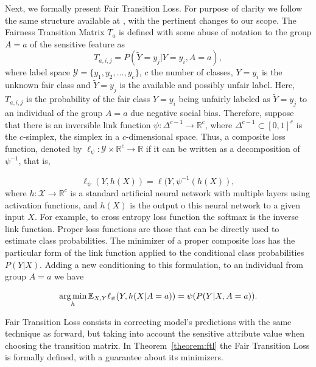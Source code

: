Next, we formally present Fair Transition Loss. For purpose of clarity we follow the same structure available at \citep{Patrini2017}, with the pertinent changes to our scope. The Fairness Transition Matrix $T_a$ is defined with some abuse of notation to the group $A=a$ of the sensitive feature as 
\begin{equation}
    T_{a,i,j} = P(\tilde{Y} = y_j|Y = y_i, A=a),
\end{equation}
where label space $\mathcal{Y} = \{y_1, y_2, \ldots, y_c\}$, $c$ the number of classes, $Y=y_i$ is the unknown fair class and $\tilde{Y}=y_j$ is the available and 
possibly unfair label. Here, $T_{a,i,j}$ is the probability of the fair class $Y=y_i$ being unfairly labeled as $\tilde{Y}=y_j$ to an individual of the group $A=a$ due negative social bias. Therefore, suppose that there is an inversible link function $\psi : \Delta^{c-1} \rightarrow \mathbb{R}^c$, where $\Delta^{c-1} \subset [0,1]^c$ is the $c$-simplex, the simplex in a $c$-dimensional space. Thus, a composite loss function, denoted by $\ell_{\psi} : \mathcal{Y} \times \mathbb{R}^c \rightarrow \mathbb{R}$ if it can be written as a decomposition of $\psi^{-1}$, that is,

\begin{equation}
    \ell_{\psi}(Y, h(X)) = \ell(Y, \psi^{-1}(h(X)), 
\end{equation}
where $h:\mathcal{X} \rightarrow \mathbb{R}^c$ is a standard artificial neural network with multiple layers using activation functions, and $h(X)$ is the output o this neural network to a given input $X$. For example, to cross entropy loss function the softmax is the inverse link function. Proper loss functions are those that can be directly used to estimate class probabilities. The minimizer of a proper composite loss has the particular form of the link function applied to the conditional class probabilities $P(Y|X)$. Adding a new conditioning to this formulation, to an individual from group $A=a$ we have

\begin{equation} \label{eq:argmin_ftl}
    \operatorname*{arg\,min}\limits_{h}\mathbb{E}_{X,Y}\ell_{\psi}(Y, h(X|A=a)) = \psi(P(Y|X,A=a)).
\end{equation}

Fair Transition Loss consists in correcting model's predictions with the same technique as forward, but taking into account the sensitive attribute value when choosing the transition matrix. In Theorem~\ref{theorem:ftl} the Fair Transition Loss is formally defined, with a guarantee about its minimizers.

